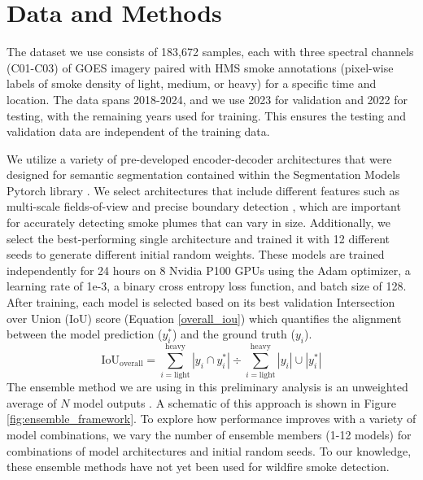 \documentclass{article}
\begin{document}
\section{Data and Methods}
The dataset we use consists of 183,672 samples, each with three spectral channels (C01-C03) of GOES imagery paired with HMS smoke annotations (pixel-wise labels of smoke density of light, medium, or heavy) for a specific time and location. The data spans 2018-2024, and we use 2023 for validation and 2022 for testing, with the remaining years used for training. This ensures the testing and validation data are independent of the training data.

We utilize a variety of pre-developed encoder-decoder architectures that were designed for semantic segmentation contained within the Segmentation Models Pytorch library \citep{semantic}. We select architectures that include different features such as multi-scale fields-of-view and precise boundary detection \citep{dlv3p,PAN,UNetpp}, which are important for accurately detecting smoke plumes that can vary in size. Additionally, we select the best-performing single architecture and trained it with 12 different seeds to generate different initial random weights. These models are trained independently for 24 hours on 8 Nvidia P100 GPUs using the Adam optimizer, a learning rate of 1e-3, a binary cross entropy loss function, and batch size of 128. After training, each model is selected based on its best validation Intersection over Union (IoU) score (Equation \ref{overall_iou}) which quantifies the alignment between the model prediction ($ y^*_{i} $) and the ground truth ($y_{i}$).
\begin{equation} \label{overall_iou}
    \text{IoU}_{\text{overall}} = {\sum\limits_{i=\text{light}}^{\text{heavy}}|y_{i}\cap y^*_{i}|} \div {\sum\limits_{i=\text{light}}^{\text{heavy}}|y_{i}|\cup|y^*_{i}|}
\end{equation}
The ensemble method we are using in this preliminary analysis is an unweighted average of $N$ model outputs \citep{nn-ensemble2}. A schematic of this approach is shown in Figure \ref{fig:ensemble_framework}. To explore how performance improves with a variety of model combinations, we vary the number of ensemble members (1-12 models) for combinations of model architectures and initial random seeds. To our knowledge, these ensemble methods have not yet been used for wildfire smoke detection.
\end{document}
